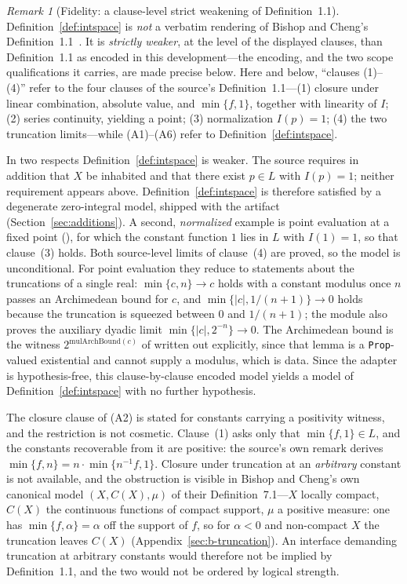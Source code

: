 \documentclass[11pt]{article}
\theoremstyle{definition}
\theoremstyle{remark}
\newtheorem{remark}[theorem]{Remark}
\begin{document}
\begin{remark}[Fidelity: a clause-level strict weakening of Definition~1.1]
\label{rem:fidelity}
Definition~\ref{def:intspace} is \emph{not} a verbatim rendering of Bishop and Cheng's Definition~1.1~\cite{bishop-cheng-1972}.  It is \emph{strictly weaker}, at the level of the displayed clauses, than Definition~1.1 as encoded in this development---the encoding, and the two scope qualifications it carries, are made precise below.  Here and below, ``clauses (1)--(4)'' refer to the four clauses of the source's Definition~1.1---(1) closure under linear combination, absolute value, and $\min\{f,1\}$, together with linearity of $I$; (2) series continuity, yielding a point; (3) normalization $I(p)=1$; (4) the two truncation limits---while (A1)--(A6) refer to Definition~\ref{def:intspace}.

In two respects Definition~\ref{def:intspace} is weaker.  The source requires in addition that $X$ be inhabited and that there exist $p\in L$ with $I(p)=1$; neither requirement appears above.  Definition~\ref{def:intspace} is therefore satisfied by a degenerate zero-integral model, shipped with the artifact (Section~\ref{sec:additions}).  A second, \emph{normalized} example is point evaluation at a fixed point (), for which the constant function $1$ lies in $L$ with $I(1)=1$, so that clause~(3) holds.  Both source-level limits of clause~(4) are proved, so the model is unconditional.  For point evaluation they reduce to statements about the truncations of a single real: $\min\{c,n\}\to c$ holds with a constant modulus once $n$ passes an Archimedean bound for $c$, and $\min\{|c|,1/(n+1)\}\to0$ holds because the truncation is squeezed between $0$ and $1/(n+1)$; the module also proves the auxiliary dyadic limit $\min\{|c|,2^{-n}\}\to0$.  The Archimedean bound is the witness $2^{\mathrm{mulArchBound}(c)}$ of  written out explicitly, since that lemma is a \texttt{Prop}-valued existential and cannot supply a modulus, which is data.  Since the adapter is hypothesis-free, this clause-by-clause encoded model yields a model of Definition~\ref{def:intspace} with no further hypothesis.

The closure clause of (A2) is stated for constants carrying a positivity witness, and the restriction is not cosmetic.  Clause~(1) asks only that $\min\{f,1\}\in L$, and the constants recoverable from it are positive: the source's own remark derives $\min\{f,n\}=n\cdot\min\{n^{-1}f,1\}$.  Closure under truncation at an \emph{arbitrary} constant is not available, and the obstruction is visible in Bishop and Cheng's own canonical model $(X,C(X),\mu)$ of their Definition~7.1---$X$ locally compact, $C(X)$ the continuous functions of compact support, $\mu$ a positive measure: one has $\min\{f,\alpha\}=\alpha$ off the support of $f$, so for $\alpha<0$ and non-compact $X$ the truncation leaves $C(X)$ (Appendix~\ref{sec:b-truncation}).  An interface demanding truncation at arbitrary constants would therefore not be implied by Definition~1.1, and the two would not be ordered by logical strength.


\end{remark}
\end{document}
